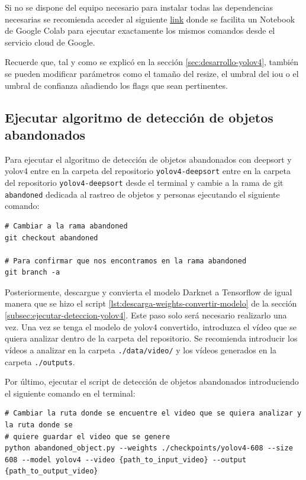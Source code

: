 Si no se dispone del equipo necesario para instalar todas las dependencias necesarias se recomienda acceder al siguiente \href{https://colab.research.google.com/drive/18vL9LH8e9VaimA9LzBD35Cn4AOm6C17I?usp=sharing}{link} donde se facilita un Notebook de Google Colab para ejecutar exactamente los mismos comandos desde el servicio cloud de Google.

Recuerde que, tal y como se explicó en la sección \ref{sec:desarrollo-yolov4}, también se pueden modificar parámetros como el tamaño del resize, el umbral del \gls{iou} o el umbral de confianza añadiendo los flags que sean pertinentes.

\subsection{Ejecutar algoritmo de detección de objetos abandonados}
\label{subsec:ejecutar-deteccion-abandoned-object}

Para ejecutar el algoritmo de detección de objetos abandonados con \gls{deepsort} y \gls{yolov4} entre en la carpeta del repositorio \texttt{yolov4-deepsort} entre en la carpeta del repositorio \texttt{yolov4-deepsort} desde el terminal y cambie a la rama de git \texttt{abandoned} dedicada al rastreo de objetos y personas ejecutando el siguiente comando:

\vspace{0.5cm}
\begin{lstlisting}[language=iPython,caption=cambiar a la rama abandoned,captionpos=b,label={lst:git-checkout-abandoned}]
# Cambiar a la rama abandoned 
git checkout abandoned

# Para confirmar que nos encontramos en la rama abandoned
git branch -a
\end{lstlisting}

Posteriormente, descargue y convierta el modelo Darknet a Tensorflow de igual manera que se hizo el script \ref{lst:descarga-weights-convertir-modelo} de la sección \ref{subsec:ejecutar-deteccion-yolov4}. Este paso solo será necesario realizarlo una vez. Una vez se tenga el modelo de \gls{yolov4} convertido, introduzca el vídeo que se quiera analizar dentro de la carpeta del repositorio. Se recomienda introducir los vídeos a analizar en la carpeta \texttt{./data/video/} y los vídeos generados en la carpeta \texttt{./outputs}.

Por último, ejecutar el script de detección de objetos abandonados introduciendo el siguiente comando en el terminal:

\vspace{0.5cm}
\begin{lstlisting}[language=iPython,caption=Ejecutar script detección de objetos abandonados con YOLOv4 y Deep SORT,captionpos=b,label={lst:ejecutar-yolov4-abandoned-object}]
# Cambiar la ruta donde se encuentre el video que se quiera analizar y la ruta donde se
# quiere guardar el video que se genere
python abandoned_object.py --weights ./checkpoints/yolov4-608 --size 608 --model yolov4 --video {path_to_input_video} --output {path_to_output_video}
\end{lstlisting}

